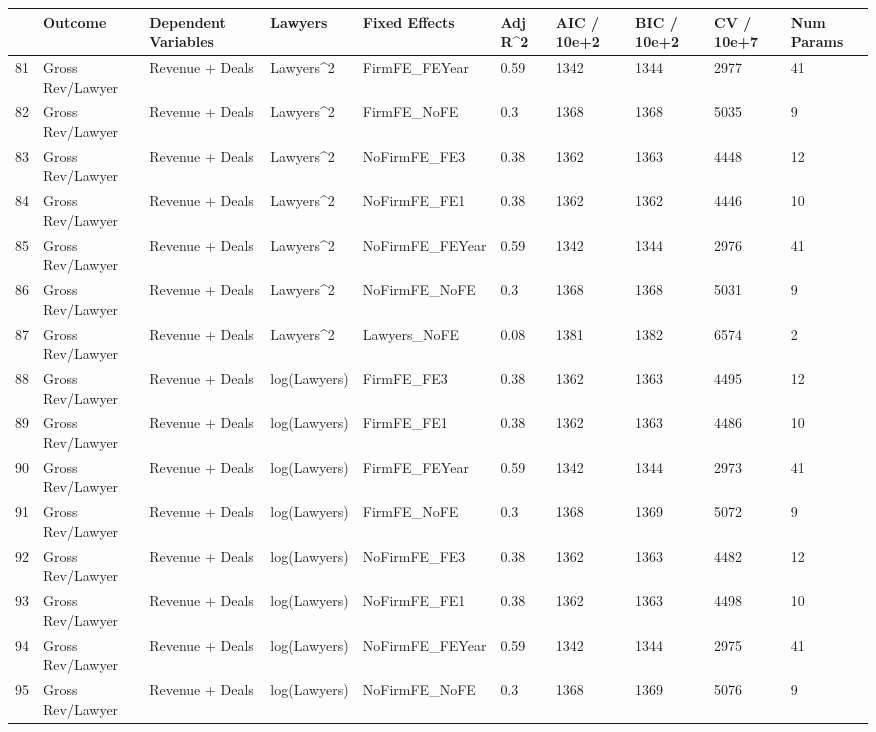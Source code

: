 \documentclass{article}
\begin{document}
\begin{table}[H]
\centering
\begin{tabular}{rlllllllll}
  \hline
 & Outcome & Dependent Variables & Lawyers & Fixed Effects & Adj R^2 & AIC / 10e+2 & BIC / 10e+2 & CV / 10e+7 & Num Params \\ 
  \hline
81 & Gross Rev/Lawyer & Revenue + Deals & Lawyers^2 & FirmFE\_FEYear & 0.59 & 1342 & 1344 & 2977 & 41 \\ 
  82 & Gross Rev/Lawyer & Revenue + Deals & Lawyers^2 & FirmFE\_NoFE & 0.3 & 1368 & 1368 & 5035 & 9 \\ 
  83 & Gross Rev/Lawyer & Revenue + Deals & Lawyers^2 & NoFirmFE\_FE3 & 0.38 & 1362 & 1363 & 4448 & 12 \\ 
  84 & Gross Rev/Lawyer & Revenue + Deals & Lawyers^2 & NoFirmFE\_FE1 & 0.38 & 1362 & 1362 & 4446 & 10 \\ 
  85 & Gross Rev/Lawyer & Revenue + Deals & Lawyers^2 & NoFirmFE\_FEYear & 0.59 & 1342 & 1344 & 2976 & 41 \\ 
  86 & Gross Rev/Lawyer & Revenue + Deals & Lawyers^2 & NoFirmFE\_NoFE & 0.3 & 1368 & 1368 & 5031 & 9 \\ 
  87 & Gross Rev/Lawyer & Revenue + Deals & Lawyers^2 & Lawyers\_NoFE & 0.08 & 1381 & 1382 & 6574 & 2 \\ 
  88 & Gross Rev/Lawyer & Revenue + Deals & log(Lawyers) & FirmFE\_FE3 & 0.38 & 1362 & 1363 & 4495 & 12 \\ 
  89 & Gross Rev/Lawyer & Revenue + Deals & log(Lawyers) & FirmFE\_FE1 & 0.38 & 1362 & 1363 & 4486 & 10 \\ 
  90 & Gross Rev/Lawyer & Revenue + Deals & log(Lawyers) & FirmFE\_FEYear & 0.59 & 1342 & 1344 & 2973 & 41 \\ 
  91 & Gross Rev/Lawyer & Revenue + Deals & log(Lawyers) & FirmFE\_NoFE & 0.3 & 1368 & 1369 & 5072 & 9 \\ 
  92 & Gross Rev/Lawyer & Revenue + Deals & log(Lawyers) & NoFirmFE\_FE3 & 0.38 & 1362 & 1363 & 4482 & 12 \\ 
  93 & Gross Rev/Lawyer & Revenue + Deals & log(Lawyers) & NoFirmFE\_FE1 & 0.38 & 1362 & 1363 & 4498 & 10 \\ 
  94 & Gross Rev/Lawyer & Revenue + Deals & log(Lawyers) & NoFirmFE\_FEYear & 0.59 & 1342 & 1344 & 2975 & 41 \\ 
  95 & Gross Rev/Lawyer & Revenue + Deals & log(Lawyers) & NoFirmFE\_NoFE & 0.3 & 1368 & 1369 & 5076 & 9 \\ 

\end{tabular}
\end{table}
\end{document}
